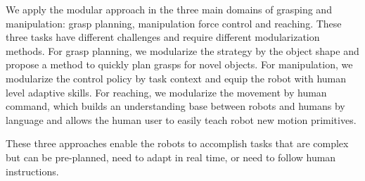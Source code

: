 
We apply the modular approach in the three main domains of grasping and manipulation: grasp planning, manipulation force control and reaching. These three tasks have different challenges and require different modularization methods. For grasp planning, we modularize the strategy by the object shape and propose a method to quickly plan grasps for novel objects. For manipulation, we modularize the control policy by task context and equip the robot with human level adaptive skills. For reaching, we modularize the movement by human command, which builds an understanding base between robots and humans by language and allows the human user to easily teach robot new motion primitives.

These three approaches enable the robots to accomplish tasks that are complex but can be pre-planned, need to adapt in real time, or need to follow human instructions.



